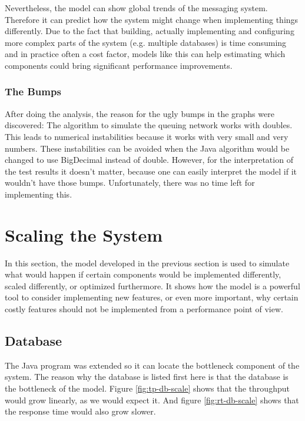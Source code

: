 \documentclass[a4paper]{article}
\begin{document}
Nevertheless, the model can show global trends of the messaging system. Therefore it can predict how the system might change when implementing things differently. Due to the fact that building, actually implementing and configuring more complex parts of the system (e.g. multiple databases) is time consuming and in practice often a cost factor, models like this can help estimating which components could bring significant performance improvements.\\

\subsubsection{The Bumps}

After doing the analysis, the reason for the ugly bumps in the graphs were discovered: The algorithm to simulate the queuing network works with doubles. This leads to numerical instabilities because it works with very small and very numbers. These instabilities can be avoided when the Java algorithm would be changed to use BigDecimal instead of double. However, for the interpretation of the test results it doesn't matter, because one can easily interpret the model if it wouldn't have those bumps. Unfortunately, there was no time left for implementing this.\\


\pagebreak

\section{Scaling the System}

In this section, the model developed in the previous section is used to simulate what would happen if certain components would be implemented differently, scaled differently, or optimized furthermore. It shows how the model is a powerful tool to consider implementing new features, or even more important, why certain costly features should not be implemented from a performance point of view.\\


\subsection{Database}

The Java program was extended so it can locate the bottleneck component of the system. The reason why the database is listed first here is that the database is the bottleneck of the model. Figure \ref{fig:tp-db-scale} shows that the throughput would grow linearly, as we would expect it. And figure \ref{fig:rt-db-scale} shows that the response time would also grow slower.\\
\end{document}
